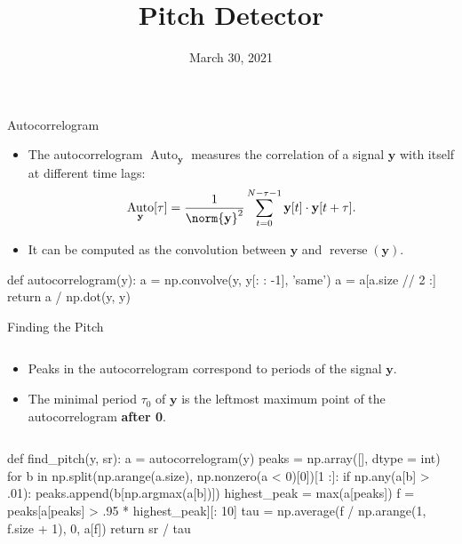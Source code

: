 \documentclass[10pt]{beamer}
\date{March 30, 2021}
\title{Pitch Detector}
\DeclareMathOperator{\Auto}{Auto}
\DeclareMathOperator{\reverse}{reverse}
\begin{document}
\def\yy{\mathbf{y}}

\frame{\titlepage}
\begin{frame}[fragile]{Autocorrelogram}
\begin{itemize}
\item The autocorrelogram $\Auto_{\yy}$ measures the correlation of a signal $\yy$ with itself at different time lags:
\[
\Auto_{\yy}[\tau]=\frac{1}{\norm{\yy}^2}\sum_{t=0}^{N-\tau-1}\yy[t]\cdot\yy[t+\tau].
\]
\item It can be computed as the convolution between $\yy$ and $\reverse(\yy)$.
\end{itemize}
\vspace{.4cm}
\begin{python}
def autocorrelogram(y):
    a = np.convolve(y, y[: : -1], 'same')
    a = a[a.size // 2 :]
    return a / np.dot(y, y)
\end{python}
\end{frame}
\begin{frame}[fragile]{Finding the Pitch}
\begin{columns}
\begin{column}{.5\textwidth}
\begin{itemize}
\item Peaks in the autocorrelogram correspond to periods of the signal $\yy$.
\item The minimal period $\tau_0$ of $\yy$ is the leftmost maximum point of the autocorrelogram \textbf{after 0}.
\end{itemize}
\end{column}
\begin{column}{.5\textwidth}
\begin{center}
\resizebox{\textwidth}{!}{}
\end{center}
\end{column}
\end{columns}
\vspace{.4cm}
\begin{python}
def find_pitch(y, sr):
    a = autocorrelogram(y)
    peaks = np.array([], dtype = int)
    for b in np.split(np.arange(a.size),
		np.nonzero(a < 0)[0])[1 :]:
	        if np.any(a[b] > .01):
	            peaks.append(b[np.argmax(a[b])])
    highest_peak = max(a[peaks])
    f = peaks[a[peaks] > .95 * highest_peak][: 10]
    tau = np.average(f / np.arange(1, f.size + 1), 0, a[f])
    return sr / tau
\end{python}
\end{frame}
\end{document}
